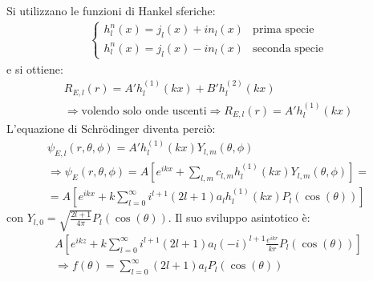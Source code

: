 Si utilizzano le funzioni di Hankel sferiche:
\begin{equation}\begin{split}
\begin{cases}
h^n_l\left(x\right)=j_l\left(x\right)+in_l\left(x\right) & \textrm{prima specie}\\
h^n_l\left(x\right)=j_l\left(x\right)-in_l\left(x\right) & \textrm{seconda specie}
\end{cases}
\end{split}\end{equation}
e si ottiene:
\begin{equation}\begin{split}
R_{E,l}\left(r\right)=A'h^{\left(1\right)}_l\left(kx\right)+B'h^{\left(2\right)}_l\left(kx\right)\\
\Longrightarrow \textrm{volendo solo onde uscenti} \Longrightarrow R_{E,l}\left(r\right)=A'h^{\left(1\right)}_l\left(kx\right)
\end{split}\end{equation}
L'equazione di Schrödinger diventa perciò:
\begin{equation}\begin{split}
\psi _{E,l}\left(r,\theta ,\phi \right)=A'h^{\left(1\right)}_l\left(kx\right)Y_{l,m}\left(\theta,\phi\right)\\
\Longrightarrow \psi _E\left(r,\theta,\phi \right)=A\left[e^{ikx}+\sum_{l,m}{c_{l,m}h^{\left(1\right)}_l\left(kx\right)Y_{l,m}\left(\theta ,\phi \right)}\right]=\\
=A\left[e^{ikx}+k\sum_{l=0}^{\infty }{i^{l+1}\left(2l+1\right)a_lh^{\left(1\right)}_l\left(kx\right)P_l\left(\cos{\left(\theta\right)}\right)}\right]
\end{split}\end{equation}
con $Y_{l,0}=\sqrt{\frac{2l+1}{4\pi}}P_l\left(\cos{\left(\theta\right)}\right)$. Il suo sviluppo asintotico è:
\begin{equation}\begin{split}
A\left[e^{ikz}+k\sum_{l=0}^{\infty }{i^{l+1}\left(2l+1\right)a_l\left(-i\right)^{l+1}\frac{e^{ikr}}{kr}P_l\left(\cos{\left(\theta\right)}\right)}\right]\\
\Longrightarrow f\left(\theta\right)=\sum_{l=0}^{\infty }{\left(2l+1\right)a_lP_l\left(\cos{\left(\theta\right)}\right)}
\end{split}\end{equation}



